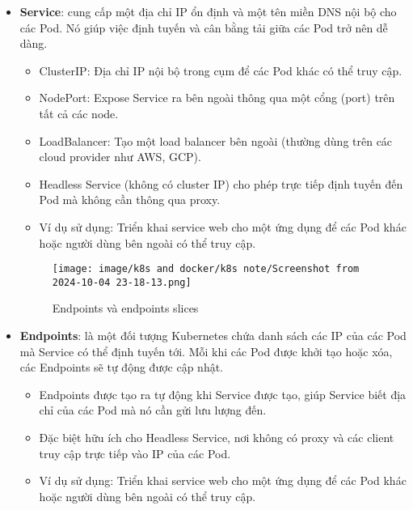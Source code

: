 \documentclass[a4paper,12pt]{article}
\begin{document}
\begin{itemize}
    
    \item \textbf{Service}:  cung cấp một địa chỉ IP ổn định và một tên miền DNS nội bộ cho các Pod. Nó giúp việc định tuyến và cân bằng tải giữa các Pod trở nên dễ dàng.
    \begin{itemize}
        \item ClusterIP: Địa chỉ IP nội bộ trong cụm để các Pod khác có thể truy cập.
        \item NodePort: Expose Service ra bên ngoài thông qua một cổng (port) trên tất cả các node.
        \item LoadBalancer: Tạo một load balancer bên ngoài (thường dùng trên các cloud provider như AWS, GCP).
        \item Headless Service (không có cluster IP) cho phép trực tiếp định tuyến đến Pod mà không cần thông qua proxy.
        \item Ví dụ sử dụng: Triển khai service web cho một ứng dụng để các Pod khác hoặc người dùng bên ngoài có thể truy cập.
    \end{itemize}


\begin{figure}[htbp]
    \centering
    \texttt{[image: image/k8s and docker/k8s note/Screenshot from 2024-10-04 23-18-13.png]}
    \caption{Endpoints và endpoints slices}
    \label{}
\end{figure}



    
    \item \textbf{Endpoints}: là một đối tượng Kubernetes chứa danh sách các IP của các Pod mà Service có thể định tuyến tới. Mỗi khi các Pod được khởi tạo hoặc xóa, các Endpoints sẽ tự động được cập nhật.
    \begin{itemize}
        \item Endpoints được tạo ra tự động khi Service được tạo, giúp Service biết địa chỉ của các Pod mà nó cần gửi lưu lượng đến.
        \item Đặc biệt hữu ích cho Headless Service, nơi không có proxy và các client truy cập trực tiếp vào IP của các Pod.
        \item Ví dụ sử dụng: Triển khai service web cho một ứng dụng để các Pod khác hoặc người dùng bên ngoài có thể truy cập.
    \end{itemize}
\end{itemize}
\end{document}
